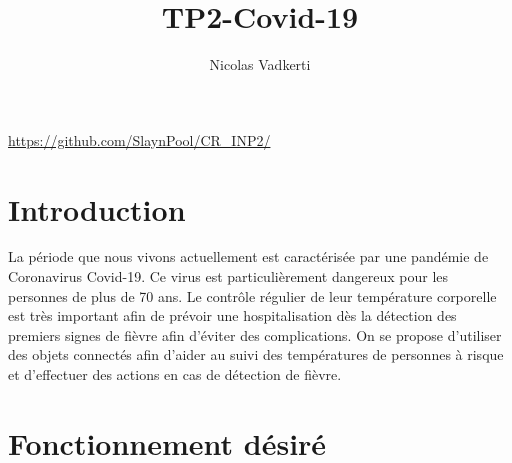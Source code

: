 \documentclass[10pt,a4paper]{article}
\title{TP2-Covid-19}
\author{Nicolas Vadkerti}
\begin{document}
\maketitle


\url{https://github.com/SlaynPool/CR_INP2/}

\section{Introduction}
La période que nous vivons actuellement est caractérisée par une pandémie de Coronavirus Covid-19. Ce virus est particulièrement dangereux pour les personnes de plus de 70 ans. Le contrôle régulier de leur température corporelle est très important afin de prévoir une hospitalisation dès la détection des premiers signes de fièvre afin d’éviter des complications. On se propose d’utiliser des objets connectés afin d’aider au suivi des températures de personnes à risque et d’effectuer des actions en cas de détection de fièvre.
\section{Fonctionnement désiré}
\end{document}
